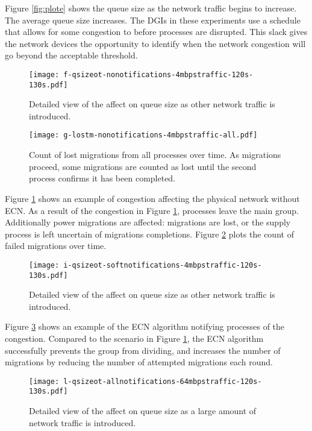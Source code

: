 Figure \ref{fig:plote} shows the queue size as the network traffic begins to increase.
The average queue size increases.
The \ac{DGI}s in these experiments use a schedule that allows for some congestion to before processes are disrupted.
This slack gives the network devices the opportunity to identify when the network congestion will go beyond the acceptable threshold.

\begin{figure}
\texttt{[image: f-qsizeot-nonotifications-4mbpstraffic-120s-130s.pdf]}
\caption{Detailed view of the affect on queue size as other network traffic is introduced.}
\label{fig:plotf}
\end{figure}

\begin{figure}
\texttt{[image: g-lostm-nonotifications-4mbpstraffic-all.pdf]}
\caption{Count of lost migrations from all processes over time. As migrations proceed, some migrations are counted as lost until the second process confirms it has been completed.}
\label{fig:plotg}
\end{figure}

Figure \ref{fig:plotf} shows an example of congestion affecting the physical network without \ac{ECN}.
As a result of the congestion in Figure \ref{fig:plotf}, processes leave the main group.
Additionally power migrations are affected: migrations are lost, or the supply process is left uncertain of migrations completions.
Figure \ref{fig:plotg} plots the count of failed migrations over time.

\begin{figure}
\texttt{[image: i-qsizeot-softnotifications-4mbpstraffic-120s-130s.pdf]}
\caption{Detailed view of the affect on queue size as other network traffic is introduced.}
\label{fig:ploti}
\end{figure}

Figure \ref{fig:ploti} shows an example of the \ac{ECN} algorithm notifying processes of the congestion.
Compared to the scenario in Figure \ref{fig:plotf}, the \ac{ECN} algorithm successfully prevents the group from dividing, and increases the number of migrations by reducing the number of attempted migrations each round.

\begin{figure}
\texttt{[image: l-qsizeot-allnotifications-64mbpstraffic-120s-130s.pdf]}
\caption{Detailed view of the affect on queue size as a large amount of network traffic is introduced.}
\label{fig:plotl}
\end{figure}

